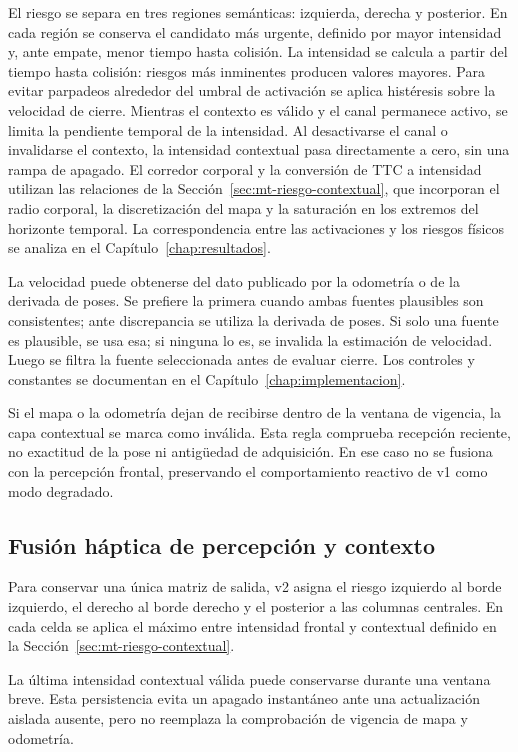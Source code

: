 El riesgo se separa en tres regiones semánticas: izquierda, derecha y posterior. En cada región se
conserva el candidato más urgente, definido por mayor intensidad y, ante empate, menor tiempo hasta
colisión. La intensidad se calcula a partir del tiempo hasta colisión: riesgos más inminentes
producen valores mayores. Para evitar parpadeos alrededor del umbral de activación se aplica
histéresis sobre la velocidad de cierre. Mientras el contexto es válido y el canal permanece
activo, se limita la pendiente temporal de la intensidad. Al desactivarse el canal o invalidarse
el contexto, la intensidad contextual pasa directamente a cero, sin una rampa de apagado.
El corredor corporal y la conversión de TTC a intensidad utilizan las relaciones de la
Sección~\ref{sec:mt-riesgo-contextual}, que incorporan el radio corporal, la discretización del
mapa y la saturación en los extremos del horizonte temporal. La correspondencia entre las
activaciones y los riesgos físicos se analiza en el Capítulo~\ref{chap:resultados}.

La velocidad puede obtenerse del dato publicado por la odometría o de la derivada de poses.
Se prefiere la primera cuando ambas fuentes plausibles son consistentes; ante discrepancia se
utiliza la derivada de poses. Si solo una fuente es plausible, se usa esa; si ninguna lo es,
se invalida la estimación de velocidad. Luego se filtra la fuente seleccionada antes de evaluar
cierre. Los controles y constantes se documentan en el Capítulo~\ref{chap:implementacion}.

Si el mapa o la odometría dejan de recibirse dentro de la ventana de vigencia, la capa contextual
se marca como inválida. Esta regla comprueba recepción reciente, no exactitud de la pose ni
antigüedad de adquisición. En
ese caso no se fusiona con la percepción frontal, preservando el comportamiento reactivo de v1 como
modo degradado.

\subsection{Fusión háptica de percepción y contexto}
\label{sec:metodo-v2-fusion}

Para conservar una única matriz de salida, v2 asigna el riesgo izquierdo al borde izquierdo, el
derecho al borde derecho y el posterior a las columnas centrales. En cada celda se aplica el máximo
entre intensidad frontal y contextual definido en la Sección~\ref{sec:mt-riesgo-contextual}.

La última intensidad contextual válida puede conservarse durante una ventana breve. Esta
persistencia evita un apagado instantáneo ante una actualización aislada ausente, pero no reemplaza
la comprobación de vigencia de mapa y odometría.


